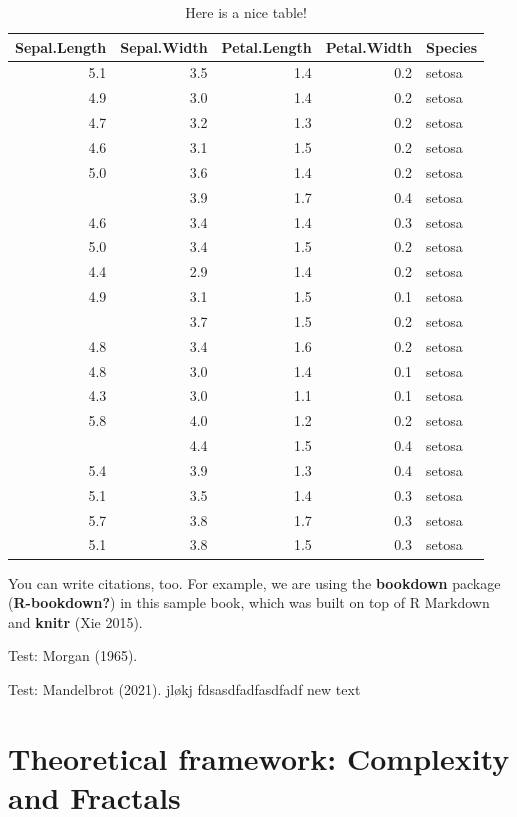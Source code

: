 \documentclass[
  12pt,
]{book}
\begin{document}
\begin{table}

\caption{\label{tab:nice-tab}Here is a nice table!}
\centering
\begin{tabular}[t]{rrrrl}
\toprule
Sepal.Length & Sepal.Width & Petal.Length & Petal.Width & Species\\
\midrule
5.1 & 3.5 & 1.4 & 0.2 & setosa\\
4.9 & 3.0 & 1.4 & 0.2 & setosa\\
4.7 & 3.2 & 1.3 & 0.2 & setosa\\
4.6 & 3.1 & 1.5 & 0.2 & setosa\\
5.0 & 3.6 & 1.4 & 0.2 & setosa\\
\addlinespace
5.4 & 3.9 & 1.7 & 0.4 & setosa\\
4.6 & 3.4 & 1.4 & 0.3 & setosa\\
5.0 & 3.4 & 1.5 & 0.2 & setosa\\
4.4 & 2.9 & 1.4 & 0.2 & setosa\\
4.9 & 3.1 & 1.5 & 0.1 & setosa\\
\addlinespace
5.4 & 3.7 & 1.5 & 0.2 & setosa\\
4.8 & 3.4 & 1.6 & 0.2 & setosa\\
4.8 & 3.0 & 1.4 & 0.1 & setosa\\
4.3 & 3.0 & 1.1 & 0.1 & setosa\\
5.8 & 4.0 & 1.2 & 0.2 & setosa\\
\addlinespace
5.7 & 4.4 & 1.5 & 0.4 & setosa\\
5.4 & 3.9 & 1.3 & 0.4 & setosa\\
5.1 & 3.5 & 1.4 & 0.3 & setosa\\
5.7 & 3.8 & 1.7 & 0.3 & setosa\\
5.1 & 3.8 & 1.5 & 0.3 & setosa\\
\bottomrule
\end{tabular}
\end{table}

You can write citations, too. For example, we are using the \textbf{bookdown} package (\textbf{R-bookdown?}) in this sample book, which was built on top of R Markdown and \textbf{knitr} (Xie 2015).

Test: Morgan (1965).

Test: Mandelbrot (2021). jløkj fdsasdfadfasdfadf new text

\hypertarget{theory}{%
\chapter{Theoretical framework: Complexity and Fractals}\label{theory}}
\end{document}

